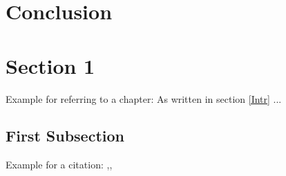 \documentclass[a4paper, 12pt, titlepage, headsepline, listof = totoc, bibliography = totoc, numbers = noenddot]{scrartcl}
\begin{document}
%
%


\newpage
\section{Conclusion}












\newpage
\section{Section 1}
Example for referring to a chapter: As written in section \ref{Intr} ...

  \subsection{First Subsection}
	Example for a citation: \cite{sqltuerker},\cite{journals/jods/VolzSM05}, \cite{das}\\
\end{document}
